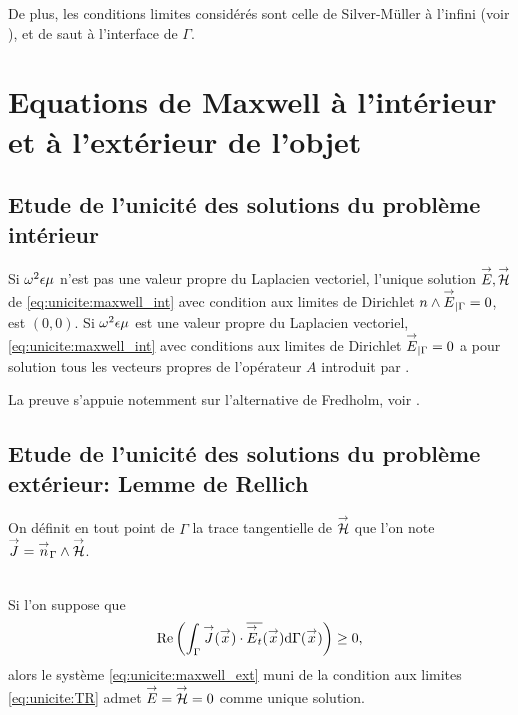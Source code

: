 De plus, les conditions limites considérés sont celle de Silver-Müller à l'infini (voir \cite[eq (5.2.24), p.~183]{nedelec_acoustic_2001}), et de saut à l'interface de \(\Gamma\).

\section{Equations de Maxwell à l'intérieur et à l'extérieur de l'objet}

    \subsection{Etude de l'unicité des solutions du problème intérieur}

        \begin{thm}
            Si \(\omega^2\epsilon\mu\) n'est pas une valeur propre du Laplacien vectoriel, l'unique solution \({\overset{\rightarrow}{E}},{\overset{\rightarrow}{\mathcal{H}}}\) de \eqref{eq:unicite:maxwell_int} avec condition aux limites de Dirichlet \(n\wedge {\overset{\rightarrow}{E}}_{|\Gamma} = 0\),  est \((0,0)\).
            Si \(\omega^2\epsilon\mu\) est une valeur propre du Laplacien vectoriel, \eqref{eq:unicite:maxwell_int} avec conditions aux limites de Dirichlet \({\overset{\rightarrow}{E}}_{|\Gamma} = 0\) a pour solution tous les vecteurs propres de l'opérateur \(A\) introduit par \cite[eq.~(133), p.~58]{cessenat_mathematical_1996}.
        \end{thm}
        La preuve s'appuie notemment sur l'alternative de Fredholm, voir \cite[Théorème~8, p.~111]{cessenat_mathematical_1996}.

    \subsection{Etude de l'unicité des solutions du problème extérieur: Lemme de Rellich}

        On définit en tout point de \(\Gamma\) la trace tangentielle de \({\overset{\rightarrow}{\mathcal{H}}}\) que l'on note \({\overset{\rightarrow}{J}} = {\overset{\rightarrow}{n}}_\Gamma \wedge {\overset{\rightarrow}{\mathcal{H}}}\).
        \begin{prop}~\\
        Si l'on suppose que
        \begin{equation}
            \label{eq:unicite:form_var:cgu}
            \operatorname{Re}\left(\int_\Gamma {\overset{\rightarrow}{J}}({\overset{\rightarrow}{x}}) \cdot {\overline{{\overset{\rightarrow}{E}}_t}}({\overset{\rightarrow}{x}}) \mathrm{d}{\Gamma({\overset{\rightarrow}{x}})}\right) \ge 0,
        \end{equation}
        alors le système \eqref{eq:unicite:maxwell_ext} muni de la condition aux limites \eqref{eq:unicite:TR} admet \({\overset{\rightarrow}{E}}={\overset{\rightarrow}{\mathcal{H}}}=0\) comme unique solution.
        \end{prop}
    
